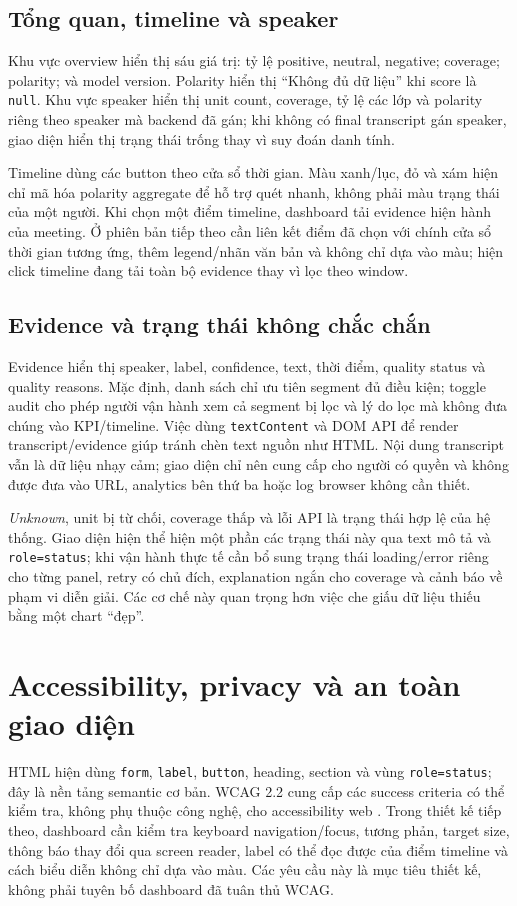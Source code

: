 \subsection{Tổng quan, timeline và speaker}
Khu vực overview hiển thị sáu giá trị: tỷ lệ positive, neutral, negative; coverage; polarity; và model version. Polarity hiển thị ``Không đủ dữ liệu'' khi score là \texttt{null}. Khu vực speaker hiển thị unit count, coverage, tỷ lệ các lớp và polarity riêng theo speaker mà backend đã gán; khi không có final transcript gán speaker, giao diện hiển thị trạng thái trống thay vì suy đoán danh tính.

Timeline dùng các button theo cửa sổ thời gian. Màu xanh/lục, đỏ và xám hiện chỉ mã hóa polarity aggregate để hỗ trợ quét nhanh, không phải màu trạng thái của một người. Khi chọn một điểm timeline, dashboard tải evidence hiện hành của meeting. Ở phiên bản tiếp theo cần liên kết điểm đã chọn với chính cửa sổ thời gian tương ứng, thêm legend/nhãn văn bản và không chỉ dựa vào màu; hiện click timeline đang tải toàn bộ evidence thay vì lọc theo window.

\subsection{Evidence và trạng thái không chắc chắn}
Evidence hiển thị speaker, label, confidence, text, thời điểm, quality status và quality reasons. Mặc định, danh sách chỉ ưu tiên segment đủ điều kiện; toggle audit cho phép người vận hành xem cả segment bị lọc và lý do lọc mà không đưa chúng vào KPI/timeline. Việc dùng \texttt{textContent} và DOM API để render transcript/evidence giúp tránh chèn text nguồn như HTML. Nội dung transcript vẫn là dữ liệu nhạy cảm; giao diện chỉ nên cung cấp cho người có quyền và không được đưa vào URL, analytics bên thứ ba hoặc log browser không cần thiết.

\textit{Unknown}, unit bị từ chối, coverage thấp và lỗi API là trạng thái hợp lệ của hệ thống. Giao diện hiện thể hiện một phần các trạng thái này qua text mô tả và \texttt{role=status}; khi vận hành thực tế cần bổ sung trạng thái loading/error riêng cho từng panel, retry có chủ đích, explanation ngắn cho coverage và cảnh báo về phạm vi diễn giải. Các cơ chế này quan trọng hơn việc che giấu dữ liệu thiếu bằng một chart ``đẹp''.

\section{Accessibility, privacy và an toàn giao diện}
HTML hiện dùng \texttt{form}, \texttt{label}, \texttt{button}, heading, section và vùng \texttt{role=status}; đây là nền tảng semantic cơ bản. WCAG 2.2 cung cấp các success criteria có thể kiểm tra, không phụ thuộc công nghệ, cho accessibility web \cite{wcag2024}. Trong thiết kế tiếp theo, dashboard cần kiểm tra keyboard navigation/focus, tương phản, target size, thông báo thay đổi qua screen reader, label có thể đọc được của điểm timeline và cách biểu diễn không chỉ dựa vào màu. Các yêu cầu này là mục tiêu thiết kế, không phải tuyên bố dashboard đã tuân thủ WCAG.

